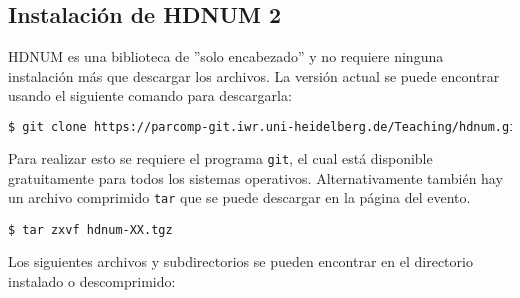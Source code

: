 \documentclass[a4paper,11pt]{article}
\theoremstyle{definition}
\begin{document}
\subsection{Instalación de HDNUM 2}

HDNUM es una biblioteca de ''solo encabezado'' y no requiere ninguna instalación más que descargar los archivos. La versión actual se puede encontrar usando el siguiente comando para descargarla:

\begin{lstlisting}[basicstyle=\ttfamily\footnotesize,language=bash,frame=single]
$ git clone https://parcomp-git.iwr.uni-heidelberg.de/Teaching/hdnum.git
\end{lstlisting}

Para realizar esto se requiere el programa \lstinline{git}, el cual está disponible gratuitamente para todos los sistemas operativos. Alternativamente también hay un archivo comprimido \lstinline{tar} que se puede descargar en la página del evento.
\begin{lstlisting}[basicstyle=\ttfamily\small,frame=single]
$ tar zxvf hdnum-XX.tgz
\end{lstlisting}
Los siguientes archivos y subdirectorios se pueden encontrar en el directorio instalado o descomprimido:
\end{document}
